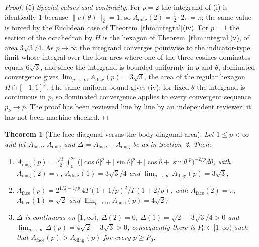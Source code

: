 \documentclass[11pt]{article}
\theoremstyle{plain}
\newtheorem{theorem}{Theorem}
\numberwithin{theorem}{section}
\begin{document}
\begin{proof}
(5) \emph{Special values and continuity.} For $p=2$ the integrand of (i) is identically $1$ because $\|e(\theta)\|_2=1$, so $A_{\mathrm{diag}}(2)=\frac12\cdot2\pi=\pi$; the same value is forced by the Euclidean case of Theorem~\ref{thm:integral}(iv). For $p=1$ the section of the octahedron by $H$ is the hexagon of Theorem~\ref{thm:integral}(v), of area $3\sqrt3/4$. As $p\to\infty$ the integrand converges pointwise to the indicator-type limit whose integral over the four arcs where one of the three cosines dominates equals $6\sqrt3$, and since the integrand is bounded uniformly in $p$ and $\theta$, dominated convergence gives $\lim_{p\to\infty}A_{\mathrm{diag}}(p)=3\sqrt3$, the area of the regular hexagon $H\cap[-1,1]^3$. The same uniform bound gives (iv): for fixed $\theta$ the integrand is continuous in $p$, so dominated convergence applies to every convergent sequence $p_k\to p$. The proof has been reviewed line by line by an independent reviewer; it has not been machine-checked.
\end{proof}

\begin{theorem}[The face-diagonal versus the body-diagonal area]\label{thm:delta}
Let $1\le p<\infty$ and let $A_{\mathrm{face}}$, $A_{\mathrm{diag}}$ and $\Delta=A_{\mathrm{face}}-A_{\mathrm{diag}}$ be as in Section~2. Then:
\begin{enumerate}
\item[(i)] $A_{\mathrm{diag}}(p)=\frac{\sqrt3}{2}\int_0^{2\pi}\big(|\cos\theta|^p+|\sin\theta|^p+|\cos\theta+\sin\theta|^p\big)^{-2/p}d\theta$, with $A_{\mathrm{diag}}(2)=\pi$, $A_{\mathrm{diag}}(1)=3\sqrt3/4$ and $\lim_{p\to\infty}A_{\mathrm{diag}}(p)=3\sqrt3$;
\item[(ii)] $A_{\mathrm{face}}(p)=2^{1/2-1/p}\,4\Gamma(1+1/p)^2/\Gamma(1+2/p)$, with $A_{\mathrm{face}}(2)=\pi$, $A_{\mathrm{face}}(1)=\sqrt2$ and $\lim_{p\to\infty}A_{\mathrm{face}}(p)=4\sqrt2$;
\item[(iii)] $\Delta$ is continuous on $[1,\infty)$, $\Delta(2)=0$, $\Delta(1)=\sqrt2-3\sqrt3/4>0$ and $\lim_{p\to\infty}\Delta(p)=4\sqrt2-3\sqrt3>0$; consequently there is $P_0\in[1,\infty)$ such that $A_{\mathrm{face}}(p)>A_{\mathrm{diag}}(p)$ for every $p\ge P_0$.
\end{enumerate}
\end{theorem}
\end{document}
